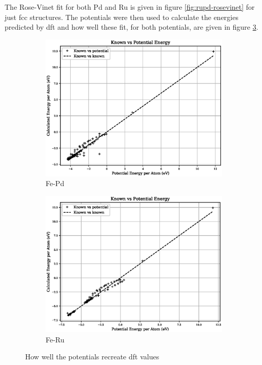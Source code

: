 The Rose-Vinet fit for both Pd and Ru is given in figure \ref{fig:rupd-rosevinet} for just \acrshort{fcc} structures.  The potentials were then used to calculate the energies predicted by \acrshort{dft} and how well these fit, for both potentials, are given in figure \ref{fig:fepd-feru-fit}.

\begin{figure}[htb]
\begin{subfigure}{.48\textwidth}
  \centering
  \includegraphics[width=.94\linewidth]{chapters/potentials_fe_pd_ru/fepd_potential/potential_known_energy_full_set.eps} 
  \caption{Fe-Pd}
  \label{fig:fepd-fit}
\end{subfigure}
\begin{subfigure}{.48\textwidth}
  \centering
  \includegraphics[width=.94\linewidth]{chapters/potentials_fe_pd_ru/feru_potential/potential_known_energy_full_set.eps} 
  \caption{Fe-Ru}
  \label{fig:feru-fit}
\end{subfigure}
\label{fig:fepd-feru-fit}
\caption{How well the potentials recreate \acrshort{dft} values}
\end{figure}



